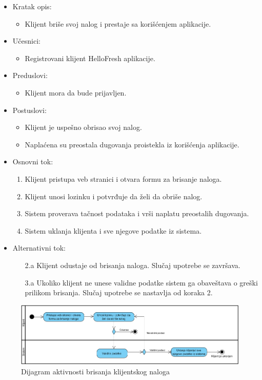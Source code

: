 
\begin{itemize}
    \item Kratak opis:
        \begin{itemize}
            \item Klijent briše svoj nalog i prestaje sa korišćenjem aplikacije.
        \end{itemize}
    \item Učesnici:
        \begin{itemize}
            \item Registrovani klijent HelloFresh aplikacije.
        \end{itemize}
    \item Preduslovi:
        \begin{itemize}
            \item Klijent mora da bude prijavljen.
        \end{itemize}
    \item Postuslovi:
        \begin{itemize}
            \item Klijent je uspešno obrisao svoj nalog.
            \item Naplaćena su preostala dugovanja proistekla iz korišćenja aplikacije.
        \end{itemize}
    \item Osnovni tok:
        \begin{enumerate}
            \item Klijent pristupa veb stranici i otvara formu za brisanje naloga.
            \item Klijent unosi lozinku i potvrđuje da želi da obriše nalog.
            \item Sistem proverava tačnost podataka i vrši naplatu preostalih dugovanja.
            \item Sistem uklanja klijenta i sve njegove podatke iz sistema.
        \end{enumerate}
    \item Alternativni tok:
        \begin{itemize}
            \item[2.a] Klijent odustaje od brisanja naloga. Slučaj upotrebe se završava.
			\item[3.a] Ukoliko klijent ne unese validne podatke sistem ga obaveštava o greški prilikom brisanja. Slučaj upotrebe se nastavlja od koraka 2.
        \end{itemize}
\end{itemize}

\begin{figure}[H]
\begin{center}
\includegraphics[width=\textwidth]{Pictures/activity_client_delete.png}
\end{center}
    \caption{Dijagram aktivnosti brisanja klijentskog naloga}
\label{fig:ActivityClientDelete}
\end{figure}
